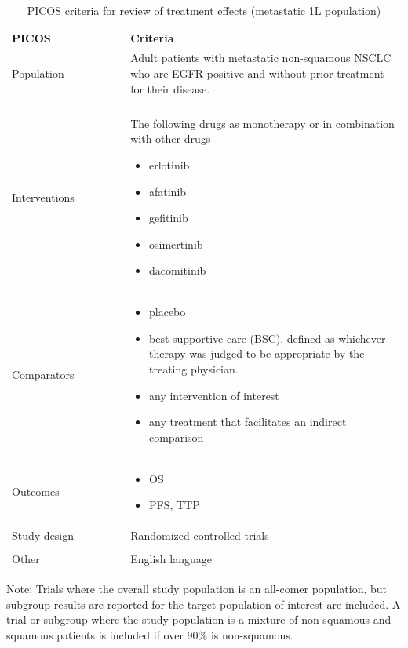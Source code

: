 \documentclass[11pt,final,fleqn]{article}\usepackage[]{graphicx}\usepackage[]{color}
\theoremstyle{plain}
\begin{document}
\begin{appendices}
\begin{table}[!ht]
\begin{center}
\begin{threeparttable}
\caption{PICOS criteria for review of treatment effects (metastatic 1L population)} \label{tbl:picos-tx-effects-1L}
\begin{tabular}{p{0.3\linewidth}p{0.7\linewidth}}
\hline
\multicolumn{1}{l}{PICOS} &  \multicolumn{1}{l}{Criteria}\\
\hline
Population & Adult patients with metastatic non-squamous NSCLC who are EGFR positive and without prior treatment for their disease.\\
&\\
Interventions & The following drugs as monotherapy or in combination with other drugs 
\begin{itemize}
\item erlotinib
\item afatinib
\item gefitinib
\item osimertinib
\item dacomitinib
\end{itemize} \\
Comparators & 
\begin{itemize}
\item placebo
\item best supportive care (BSC), defined as whichever therapy was judged to be appropriate by the treating physician.
\item any intervention of interest
\item any treatment that facilitates an indirect comparison
\end{itemize} \\
Outcomes & 
\begin{itemize}
\item OS
\item PFS, TTP
\end{itemize} \\
Study design & Randomized controlled trials \\
&\\
Other & English language\\
\hline
\end{tabular}
\scriptsize Note: Trials where the overall study population is an all-comer population, but subgroup results are reported for the target population of interest are included. A trial or subgroup where the study population is a mixture of non-squamous and squamous patients is included if over 90\% is non-squamous. 
\end{threeparttable}
\end{center}
\end{table}



\end{appendices}
\end{document}
